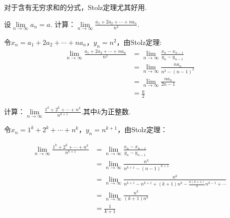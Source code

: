 对于含有无穷求和的分式，Stolz定理尤其好用.

\begin{example}
\label{ex:ch01-33}
设$\lim\limits_{n \to \infty}a_{n}=a$. 计算：$\lim\limits_{n \to \infty}\displaystyle\frac{a_{1}+2a_{2}+\cdots +na_{n}}{n^{2}}$.
\end{example}

\begin{solution}
令$x_{n}=a_{1}+2a_{2}+\cdots +na_{n}$，$y_{n}=n^{2}$，由Stolz定理:
\begin{equation}
    \begin{aligned}
        \lim\limits_{n \to \infty}\displaystyle\frac{a_{1}+2a_{2}+\cdots +na_{n}}{n^{2}}
        &= \lim\limits_{n \to \infty}\frac{x_{n}-x_{n-1}}{y_{n}-y_{n-1}}\\
        &= \lim\limits_{n \to \infty} \frac{na_{n}}{n^{2}-(n-1)^{2}}\\
        &= \lim\limits_{n \to \infty} \frac{na_{n}}{2n-1}\\
        &= \frac{a}{2}
        \nonumber
    \end{aligned}
\end{equation}
\end{solution}

\begin{example}
\label{ex:ch01-34}
计算：$\lim\limits_{n \to \infty}\displaystyle\frac{1^{k}+2^{k}+\cdots +n^{k}}{n^{k+1}}$.其中$k$为正整数.
\end{example}

\begin{solution}
令$x_{n}=1^{k}+2^{k}+\cdots +n^{k}$，$y_{n}=n^{k+1}$，由Stolz定理：

\begin{equation}
    \begin{aligned}
        \lim\limits_{n \to \infty}\displaystyle\frac{1^{k}+2^{k}+\cdots +n^{k}}{n^{k+1}}
        &= \lim\limits_{n \to \infty}\frac{x_{n}-x_{n-1}}{y_{n}-y_{n-1}}\\
        &= \lim\limits_{n \to \infty}\frac{n^{k}}{n^{k+1}-(n-1)^{k+1}}\\
        &= \lim\limits_{n \to \infty}\frac{n^{k}}{n^{k+1}-n^{k+1}+(k+1)n^{k}-\frac{k(k+1)}{2}n^{k-1}+\cdots}\\
        &= \lim\limits_{n \to \infty}\frac{n^{k}}{(k+1)n^{k}} \\
        &= \frac{1}{k+1}
        \nonumber
    \end{aligned}
\end{equation}
\end{solution}

